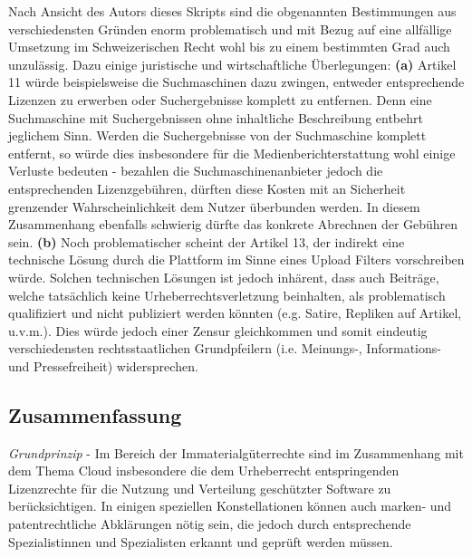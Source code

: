 \documentclass[a4paper,pointlessnumbers]{scrreprt}
\begin{document}
Nach Ansicht des Autors dieses Skripts sind die obgenannten Bestimmungen aus verschiedensten Gründen enorm problematisch und mit Bezug auf eine allfällige Umsetzung im Schweizerischen Recht wohl bis zu einem bestimmten Grad auch unzulässig. Dazu einige juristische und wirtschaftliche Überlegungen: \textbf{(a)} Artikel 11 würde beispielsweise die Suchmaschinen dazu zwingen, entweder entsprechende Lizenzen zu erwerben oder Suchergebnisse komplett zu entfernen. Denn eine Suchmaschine mit Suchergebnissen ohne inhaltliche Beschreibung entbehrt jeglichem Sinn. Werden die Suchergebnisse von der Suchmaschine komplett entfernt, so würde dies insbesondere für die Medienberichterstattung wohl einige Verluste bedeuten - bezahlen die Suchmaschinenanbieter jedoch die entsprechenden Lizenzgebühren, dürften diese Kosten mit an Sicherheit grenzender Wahrscheinlichkeit dem Nutzer überbunden werden. In diesem Zusammenhang ebenfalls schwierig dürfte das konkrete Abrechnen der Gebühren sein. \textbf{(b)} Noch problematischer scheint der Artikel 13, der indirekt eine technische Lösung durch die Plattform im Sinne eines Upload Filters vorschreiben würde. Solchen technischen Lösungen ist jedoch inhärent, dass auch Beiträge, welche tatsächlich keine Urheberrechtsverletzung beinhalten, als problematisch qualifiziert und nicht publiziert werden könnten (e.g. Satire, Repliken auf Artikel, u.v.m.). Dies würde jedoch einer Zensur gleichkommen und somit eindeutig verschiedensten rechtsstaatlichen Grundpfeilern (i.e. Meinungs-, Informations- und Pressefreiheit) widersprechen.

\subsection{Zusammenfassung}
\textit{Grundprinzip} - Im Bereich der Immaterialgüterrechte sind im Zusammenhang mit dem Thema Cloud insbesondere die dem Urheberrecht entspringenden Lizenzrechte für die Nutzung und Verteilung geschützter Software zu berücksichtigen. In einigen speziellen Konstellationen können auch marken- und patentrechtliche Abklärungen nötig sein, die jedoch durch entsprechende Spezialistinnen und Spezialisten erkannt und geprüft werden müssen.
\end{document}
